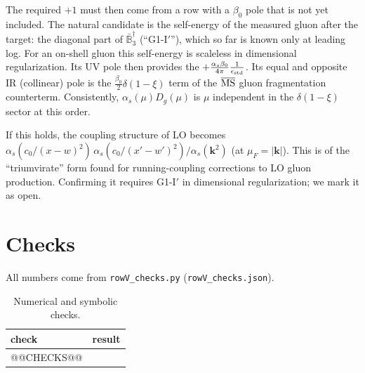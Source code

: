 \documentclass[10pt]{article}
\numberwithin{equation}{section}
\newcommand{\ve}{\epsilon}
\def\mf#1{\mathbb{#1}}
\begin{document}
The required $+1$ must then come from a row with a $\beta_0$ pole that is not yet included. The natural candidate is the self-energy of the measured gluon after the target: the diagonal part of $\bar{\mf B}_3^\dagger$ (``G1-I$'$''), which so far is known only at leading log. For an on-shell gluon this self-energy is scaleless in dimensional regularization. Its UV pole then provides the $+\frac{\alpha_s\beta_0}{4\pi}\frac1{\ve_{\rm std}}$. Its equal and opposite IR (collinear) pole is the $\frac{\beta_0}{2}\delta(1-\xi)$ term of the $\overline{\rm MS}$ gluon fragmentation counterterm. Consistently, $\alpha_s(\mu)D_g(\mu)$ is $\mu$ independent in the $\delta(1-\xi)$ sector at this order.

If this holds, the coupling structure of LO becomes $\alpha_s(c_0/(x-w)^2)\,\alpha_s(c_0/(x'-w')^2)/\alpha_s(\mathbf k^2)$ (at $\mu_F=|\mathbf k|$). This is of the ``triumvirate'' form found for running-coupling corrections to LO gluon production. Confirming it requires G1-I$'$ in dimensional regularization; we mark it as open.

\section{Checks}\label{sec:checks}
All numbers come from \texttt{rowV\_checks.py} (\texttt{rowV\_checks.json}).
\begin{table}[H]
\centering\small
\begin{tabular}{@{}p{} p{}@{}}
check & result\\ \hline
@@CHECKS@@
\end{tabular}
\caption{Numerical and symbolic checks.}
\label{tab:checks}
\end{table}
\end{document}
